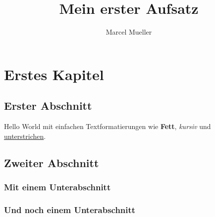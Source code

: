 \documentclass[12pt,a4paper,final]{scrbook}
\author{Marcel Mueller}
\title{Mein erster Aufsatz}
\begin{document}
	\chapter{Erstes Kapitel}
	\section{Erster Abschnitt}
	Hello World mit einfachen Textformatierungen wie \textbf{Fett}, \textit{kursiv} und \underline{unterstrichen}. 
	\section{Zweiter Abschnitt}
	\blindtext
	\subsection{Mit einem Unterabschnitt}
	\blindtext
	\subsection{Und noch einem Unterabschnitt}
	\blindtext
	\blindtext
	\blindtext
	\blindtext
	\blindtext
	\blindtext
	\blindtext
	\blindtext
	\blindtext
	\blindtext
	\blindtext
	\blindtext
\end{document}
